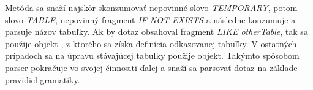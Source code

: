 Metóda  sa snaží najskôr skonzumovať nepovinné slovo \textit{TEMPORARY}, potom slovo \textit{TABLE}, nepovinný fragment \textit{IF NOT EXISTS} a následne konzumuje a parsuje názov tabuľky. Ak by dotaz obsahoval fragment \textit{LIKE otherTable}, tak sa použije objekt , z ktorého sa získa definícia odkazovanej tabuľky. V ostatných prípadoch sa na úpravu stávajúcej tabuľky použije  objekt. Takýmto spôsobom parser pokračuje vo svojej činnositi ďalej a snaží sa parsovať dotaz na základe pravidiel gramatiky.
